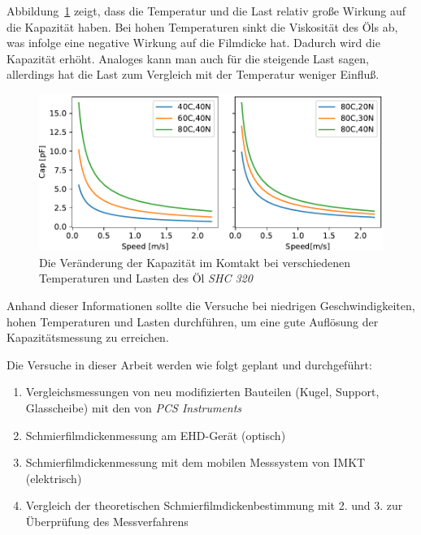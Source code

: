 Abbildung~\ref{fig:film_cap_with_dif_temp_and_load} zeigt, dass die Temperatur und die Last relativ große Wirkung auf die Kapazität haben.
Bei hohen Temperaturen sinkt die Viskosität des Öls ab, was infolge eine negative Wirkung auf die Filmdicke hat.
Dadurch wird die Kapazität erhöht.
Analoges kann man auch für die steigende Last sagen, allerdings hat die Last zum Vergleich mit der Temperatur weniger Einfluß.

\begin{figure}[htb]
    \centering
    \includegraphics[]{./images/cap_with_dif_temp_and_load_shc320.pdf}
    \caption{Die Veränderung der Kapazität im Komtakt bei verschiedenen Temperaturen und Lasten des Öl \textit{SHC 320}}
    \label{fig:film_cap_with_dif_temp_and_load}
\end{figure}

Anhand dieser Informationen sollte die Versuche bei niedrigen Geschwindigkeiten, hohen Temperaturen und Lasten durchführen, um eine gute Auflösung der Kapazitätsmessung zu erreichen.

Die Versuche in dieser Arbeit werden wie folgt geplant und durchgeführt:
\begin{enumerate}
    \item Vergleichsmessungen von neu modifizierten Bauteilen (Kugel, Support, Glasscheibe) mit den von \textit{PCS Instruments}
    \item Schmierfilmdickenmessung am EHD-Gerät (optisch)
    \item Schmierfilmdickenmessung mit dem mobilen Messsystem von IMKT (elektrisch)
    \item Vergleich der theoretischen Schmierfilmdickenbestimmung mit 2. und 3. zur Überprüfung des Messverfahrens
\end{enumerate}

